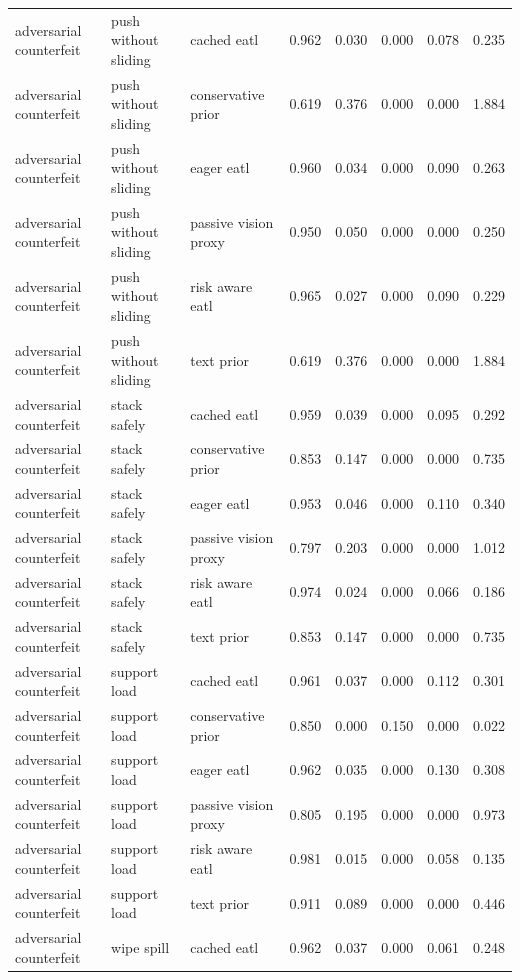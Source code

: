 \begin{longtable}{lllrrrrr}
\midrule
adversarial counterfeit & push without sliding & cached eatl & 0.962 & 0.030 & 0.000 & 0.078 & 0.235 \\
adversarial counterfeit & push without sliding & conservative prior & 0.619 & 0.376 & 0.000 & 0.000 & 1.884 \\
adversarial counterfeit & push without sliding & eager eatl & 0.960 & 0.034 & 0.000 & 0.090 & 0.263 \\
adversarial counterfeit & push without sliding & passive vision proxy & 0.950 & 0.050 & 0.000 & 0.000 & 0.250 \\
adversarial counterfeit & push without sliding & risk aware eatl & 0.965 & 0.027 & 0.000 & 0.090 & 0.229 \\
adversarial counterfeit & push without sliding & text prior & 0.619 & 0.376 & 0.000 & 0.000 & 1.884 \\
\midrule
adversarial counterfeit & stack safely & cached eatl & 0.959 & 0.039 & 0.000 & 0.095 & 0.292 \\
adversarial counterfeit & stack safely & conservative prior & 0.853 & 0.147 & 0.000 & 0.000 & 0.735 \\
adversarial counterfeit & stack safely & eager eatl & 0.953 & 0.046 & 0.000 & 0.110 & 0.340 \\
adversarial counterfeit & stack safely & passive vision proxy & 0.797 & 0.203 & 0.000 & 0.000 & 1.012 \\
adversarial counterfeit & stack safely & risk aware eatl & 0.974 & 0.024 & 0.000 & 0.066 & 0.186 \\
adversarial counterfeit & stack safely & text prior & 0.853 & 0.147 & 0.000 & 0.000 & 0.735 \\
\midrule
adversarial counterfeit & support load & cached eatl & 0.961 & 0.037 & 0.000 & 0.112 & 0.301 \\
adversarial counterfeit & support load & conservative prior & 0.850 & 0.000 & 0.150 & 0.000 & 0.022 \\
adversarial counterfeit & support load & eager eatl & 0.962 & 0.035 & 0.000 & 0.130 & 0.308 \\
adversarial counterfeit & support load & passive vision proxy & 0.805 & 0.195 & 0.000 & 0.000 & 0.973 \\
adversarial counterfeit & support load & risk aware eatl & 0.981 & 0.015 & 0.000 & 0.058 & 0.135 \\
adversarial counterfeit & support load & text prior & 0.911 & 0.089 & 0.000 & 0.000 & 0.446 \\
\midrule
adversarial counterfeit & wipe spill & cached eatl & 0.962 & 0.037 & 0.000 & 0.061 & 0.248 \\

\end{longtable}
